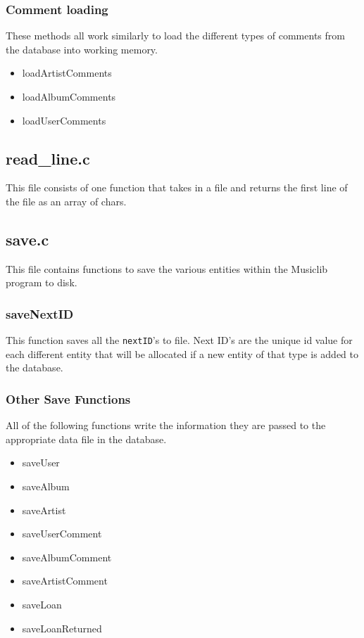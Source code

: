\documentclass{article}
\begin{document}
\subsubsection*{Comment loading}
These methods all work similarly to load the different types of comments from the database into working memory.
\begin{itemize}
\item{loadArtistComments}
\item{loadAlbumComments}
\item{loadUserComments}
\end{itemize}

\subsection{read\_line.c}
This file consists of one function that takes in a file and returns the first line of the file as an array of chars.

\subsection{save.c}
This file contains functions to save the various entities within the Musiclib program to disk.

\subsubsection*{saveNextID}
This function saves all the \verb|nextID|'s to file. Next ID's are the unique id value for each different entity that will be allocated if a new entity of that type is added to the database.

\subsubsection*{Other Save Functions}
All of the following functions write the information they are passed to the appropriate data file in the database.
\begin{itemize}
\item{saveUser}
\item{saveAlbum}
\item{saveArtist}
\item{saveUserComment}
\item{saveAlbumComment}
\item{saveArtistComment}
\item{saveLoan}
\item{saveLoanReturned}
\end{itemize}
\end{document}
